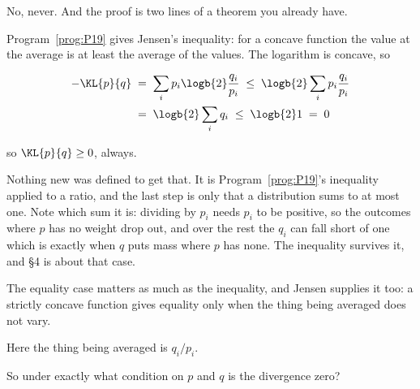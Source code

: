 \begin{fr}
\begin{ansblock}
No, never. And the proof is two lines of a theorem you already have.

Program~\ref{prog:P19} gives Jensen's inequality: for a concave function the
value at the average is at least the average of the values. The logarithm is
concave, so

\begin{align*}
  -\KL{p}{q} &\;=\; \sum_i p_i \logb{2}\frac{q_i}{p_i}
              \;\le\; \logb{2} \sum_i p_i \frac{q_i}{p_i} \\
              &\;=\; \logb{2} \sum_i q_i \;\le\; \logb{2} 1 \;=\; 0
\end{align*}

so $\KL{p}{q} \ge 0$, always.
\end{ansblock}

Nothing new was defined to get that. It is Program~\ref{prog:P19}'s
inequality applied to a ratio, and the last step is only that a distribution
sums to at most one. Note which sum it is: dividing by $p_i$ needs $p_i$ to be
positive, so the outcomes where $p$ has no weight drop out, and over the rest
the $q_i$ can fall short of one \dash{} which is exactly when $q$ puts mass
where $p$ has none. The inequality survives it, and §4 is about that case.
\end{fr}

\begin{fr}
The equality case matters as much as the inequality, and Jensen supplies it
too: a strictly concave function gives equality only when the thing being
averaged does not vary.

Here the thing being averaged is $q_i/p_i$.

So under exactly what condition on $p$ and $q$ is the divergence zero?
\dotline
\nextframe
\end{fr}

